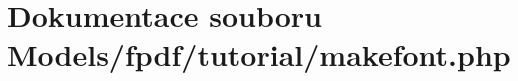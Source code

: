 \hypertarget{tutorial_2makefont_8php}{\section{Dokumentace souboru Models/fpdf/tutorial/makefont.php}
\label{tutorial_2makefont_8php}
}

